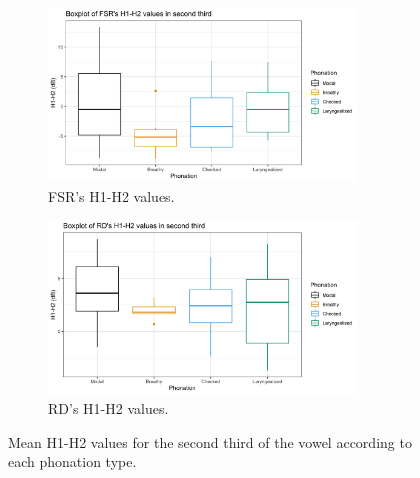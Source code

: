 \documentclass[12pt, letterpaper]{article}
\begin{document}
\begin{figure}[!h]
	\centering
	\begin{subfigure}{.5\textwidth}
		\centering
		\includegraphics[width=0.9\textwidth]{../mean_FSR_h1h2_2nd.png}
		\caption{FSR's H1-H2 values.}
		\label{fig:FSRh1h2second} 
	\end{subfigure}%
	\begin{subfigure}{.5\textwidth}
		\centering
		\includegraphics[width=0.9\textwidth]{../mean_RD_h1h2_2nd.png}
		\caption{RD's H1-H2 values.}
		\label{fig:RDh1h2second} 
	\end{subfigure}
	\caption{Mean H1-H2 values for the second third of the vowel according to each phonation type.}
	\label{fig:h1h2second}
\end{figure}
\end{document}
